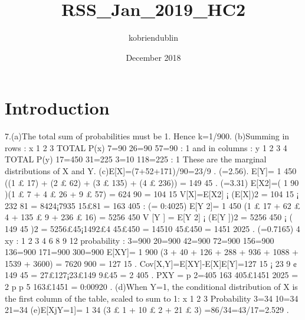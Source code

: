 \documentclass{article}
\title{RSS_Jan_2019_HC2}
\author{kobriendublin }
\date{December 2018}
\begin{document}
\maketitle

\section{Introduction}

7.(a)The total sum of probabilities must be 1. Hence k=1/900.
(b)Summing in rows : x 1 2 3 TOTAL
P(x) 7=90 26=90 57=90 : 1
and in columns : y 1 2 3 4 TOTAL
P(y) 17=450 31=225 3=10 118=225 : 1
These are the marginal distributions of X and Y.
(c)E[X]=(7+52+171)/90=23/9 . (=2.56).
E[Y]= 1
450 ((1 £ 17) + (2 £ 62) + (3 £ 135) + (4 £ 236)) = 149
45 . (=3.31)
E[X2]=( 1
90 )(1 £ 7 + 4 £ 26 + 9 £ 57) = 624
90 = 104
15
V[X]=E[X2] ¡ (E[X])2 = 104
15 ¡ 232
81 = 8424¡7935
15£81 = 163
405 : (= 0:4025)
E[Y 2]= 1
450 (1 £ 17 + 62 £ 4 + 135 £ 9 + 236 £ 16) = 5256
450
V [Y ] = E[Y 2] ¡ (E[Y ])2 = 5256
450 ¡ ( 149
45 )2 = 5256£45¡1492£4
45£450
= 14510
45£450 = 1451
2025 . (=0.7165)
4
xy : 1 2 3 4 6 8 9 12
probability : 3=900 20=900 42=900 72=900 156=900 136=900 171=900 300=900
E[XY]= 1
900 (3 + 40 + 126 + 288 + 936 + 1088 + 1539 + 3600) = 7620
900 = 127
15 .
Cov[X,Y]=E[XY]-E[X]E[Y]=127
15 ¡ 23
9 ¢ 149
45 = 27£127¡23£149
9£45 = 2
405 .
PXY = p 2=405
163
405£1451
2025
= 2
p
p 5
163£1451 = 0:00920 .
(d)When Y=1, the conditional distribution of X is the first column of the table, scaled to sum to
1:
x 1 2 3
Probability 3=34 10=34 21=34
(e)E[XjY=1]= 1
34 (3 £ 1 + 10 £ 2 + 21 £ 3) =86/34=43/17=2.529 .
\end{document}
